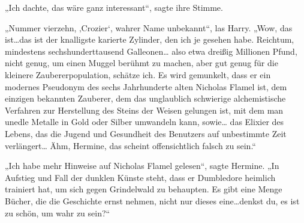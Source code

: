„Ich dachte, das wäre ganz interessant“, sagte ihre Stimme.

„Nummer vierzehn, ‚Crozier‘, wahrer Name unbekannt“, las Harry. „Wow, das ist…das ist der knalligste karierte Zylinder, den ich je gesehen habe. Reichtum, mindestens sechshunderttausend Galleonen… also etwa dreißig Millionen Pfund, nicht genug, um einen Muggel berühmt zu machen, aber gut genug für die kleinere Zaubererpopulation, schätze ich. Es wird gemunkelt, dass er ein modernes Pseudonym des sechs Jahrhunderte alten Nicholas Flamel ist, dem einzigen bekannten Zauberer, dem das unglaublich schwierige alchemistische Verfahren zur Herstellung des Steins der Weisen gelungen ist, mit dem man unedle Metalle in Gold oder Silber umwandeln kann, sowie… das Elixier des Lebens, das die Jugend und Gesundheit des Benutzers auf unbestimmte Zeit verlängert… Ähm, Hermine, das scheint offensichtlich falsch zu sein.“

„Ich habe mehr Hinweise auf Nicholas Flamel gelesen“, sagte Hermine. „In Aufstieg und Fall der dunklen Künste steht, dass er Dumbledore heimlich trainiert hat, um sich gegen Grindelwald zu behaupten. Es gibt eine Menge Bücher, die die Geschichte ernst nehmen, nicht nur dieses eine…denkst du, es ist zu schön, um wahr zu sein?“

